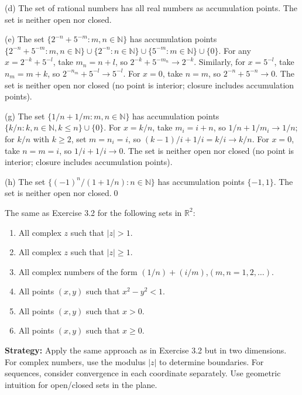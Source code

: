 (d) The set of rational numbers has all real numbers as accumulation points. The set is neither open nor closed.

(e) The set $\{2^{-n} + 5^{-m} : m,n \in \mathbb{N}\}$ has accumulation points $\{2^{-n} + 5^{-m} : m,n \in \mathbb{N}\} \cup \{2^{-n} : n \in \mathbb{N}\} \cup \{5^{-m} : m \in \mathbb{N}\} \cup \{0\}$. For any $x = 2^{-k} + 5^{-l}$, take $m_n = n + l$, so $2^{-k} + 5^{-m_n} \to 2^{-k}$. Similarly, for $x = 5^{-l}$, take $n_m = m + k$, so $2^{-n_m} + 5^{-l} \to 5^{-l}$. For $x = 0$, take $n = m$, so $2^{-n} + 5^{-n} \to 0$. The set is neither open nor closed (no point is interior; closure includes accumulation points).

(g) The set $\{1/n + 1/m : m,n \in \mathbb{N}\}$ has accumulation points $\{k/n : k,n \in \mathbb{N}, k \leq n\} \cup \{0\}$. For $x = k/n$, take $m_i = i + n$, so $1/n + 1/m_i \to 1/n$; for $k/n$ with $k \geq 2$, set $m = n_i = i$, so $(k-1)/i + 1/i = k/i \to k/n$. For $x = 0$, take $n = m = i$, so $1/i + 1/i \to 0$. The set is neither open nor closed (no point is interior; closure includes accumulation points).

(h) The set $\{(-1)^n/(1+1/n) : n \in \mathbb{N}\}$ has accumulation points $\{-1, 1\}$. The set is neither open nor closed.\qed


\begin{problembox}
The same as Exercise 3.2 for the following sets in $\mathbb{R}^2$:
\begin{enumerate}[label=\textbf{(\alph*)}]
\item All complex $z$ such that $|z| > 1$.
\item All complex $z$ such that $|z| \ge 1$.
\item All complex numbers of the form $(1/n) + (i/m)$,\quad $(m, n = 1, 2, \dots)$.
\item All points $(x, y)$ such that $x^2 - y^2 < 1$.
\item All points $(x, y)$ such that $x > 0$.
\item All points $(x, y)$ such that $x \ge 0$.
\end{enumerate}
\end{problembox}

\noindent\textbf{Strategy:} Apply the same approach as in Exercise 3.2 but in two dimensions. For complex numbers, use the modulus $|z|$ to determine boundaries. For sequences, consider convergence in each coordinate separately. Use geometric intuition for open/closed sets in the plane.

